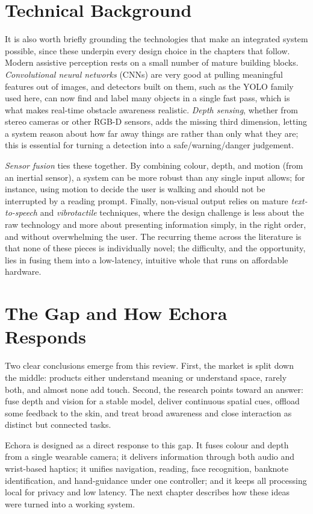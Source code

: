 \section{Technical Background}

It is also worth briefly grounding the technologies that make an integrated system possible, since these underpin every design choice in the chapters that follow. Modern assistive perception rests on a small number of mature building blocks. \emph{Convolutional neural networks} (CNNs) are very good at pulling meaningful features out of images, and detectors built on them, such as the YOLO family used here, can now find and label many objects in a single fast pass, which is what makes real-time obstacle awareness realistic. \emph{Depth sensing}, whether from stereo cameras or other RGB-D sensors, adds the missing third dimension, letting a system reason about how far away things are rather than only what they are; this is essential for turning a detection into a safe/warning/danger judgement.

\emph{Sensor fusion} ties these together. By combining colour, depth, and motion (from an inertial sensor), a system can be more robust than any single input allows; for instance, using motion to decide the user is walking and should not be interrupted by a reading prompt. Finally, non-visual output relies on mature \emph{text-to-speech} and \emph{vibrotactile} techniques, where the design challenge is less about the raw technology and more about presenting information simply, in the right order, and without overwhelming the user. The recurring theme across the literature is that none of these pieces is individually novel; the difficulty, and the opportunity, lies in fusing them into a low-latency, intuitive whole that runs on affordable hardware.

\section{The Gap and How Echora Responds}

Two clear conclusions emerge from this review. First, the market is split down the middle: products either understand meaning or understand space, rarely both, and almost none add touch. Second, the research points toward an answer: fuse depth and vision for a stable model, deliver continuous spatial cues, offload some feedback to the skin, and treat broad awareness and close interaction as distinct but connected tasks.

Echora is designed as a direct response to this gap. It fuses colour and depth from a single wearable camera; it delivers information through both audio and wrist-based haptics; it unifies navigation, reading, face recognition, banknote identification, and hand-guidance under one controller; and it keeps all processing local for privacy and low latency. The next chapter describes how these ideas were turned into a working system.
